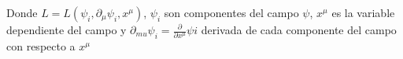 \documentclass[preview]{standalone}
\begin{document}
\begin{justify}
Donde $L=L(\psi_i,\partial_{\mu}\psi_i,x^{\mu})$, $\psi_i$ son componentes del campo $\psi$, $x^{\mu}$ es la variable dependiente del campo y $\partial_{mu}\psi_i=\frac{\partial}{\partial x^{\mu}}\psi i$ derivada de cada componente del campo con respecto a $x^{\mu}$
\end{justify}
\end{document}
